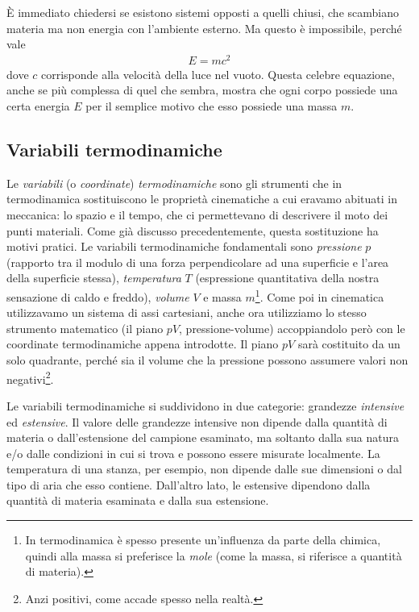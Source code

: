 \noindent È immediato chiedersi se esistono sistemi opposti a quelli chiusi, che
scambiano materia ma non energia con l'ambiente esterno. Ma questo
è impossibile, perché vale
\begin{align}
    E = mc^2
\end{align}
\noindent dove $c$ corrisponde alla velocità della luce nel vuoto.
Questa celebre equazione, anche se più complessa di quel che
sembra, mostra che ogni corpo possiede una certa energia $E$ per il semplice
motivo che esso possiede una massa $m$.

\subsection{Variabili termodinamiche}
Le \textit{variabili} (o \textit{coordinate}) \textit{termodinamiche}
sono gli strumenti che in termodinamica sostituiscono le proprietà
cinematiche a cui eravamo abituati in meccanica: lo spazio e il tempo,
che ci permettevano di descrivere il moto dei punti materiali.
Come già discusso precedentemente, questa sostituzione ha motivi pratici.
Le variabili termodinamiche fondamentali sono \textit{pressione} $p$
(rapporto tra il modulo di una forza perpendicolare ad una superficie
e l'area della superficie stessa), \textit{temperatura} $T$ (espressione
quantitativa della nostra sensazione di caldo e freddo), \textit{volume} $V$
e massa $m$\footnote{In termodinamica è spesso presente un'influenza da parte
della chimica, quindi alla massa si preferisce la \textit{mole} (come
la massa, si riferisce a quantità di materia).}. Come poi in cinematica
utilizzavamo un sistema di assi cartesiani, anche ora utilizziamo lo
stesso strumento matematico (il piano $pV$, pressione-volume) accoppiandolo però con le coordinate termodinamiche
appena introdotte. Il piano $pV$ sarà costituito da un solo quadrante,
perché sia il volume che la pressione possono assumere valori non
negativi\footnote{Anzi positivi, come accade spesso nella realtà.}.

Le variabili termodinamiche si suddividono in due categorie:
grandezze \textit{intensive} ed \textit{estensive}. Il valore delle
grandezze intensive non dipende dalla quantità di materia o dall'estensione
del campione esaminato, ma soltanto dalla sua natura e/o dalle
condizioni in cui si trova e possono essere misurate localmente.
La temperatura di una stanza, per esempio, non dipende dalle sue
dimensioni o dal tipo di aria che esso contiene. Dall'altro lato,
le estensive dipendono dalla quantità di materia esaminata e dalla
sua estensione.

